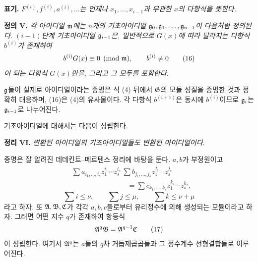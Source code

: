 \medskip
\noindent\textbf{표기.} \emph{\(F^{(i)},f^{(i)},a^{(i)},\ldots\)는 언제나 \(x_1,\ldots,x_{i-1}\)과 무관한 \(x\)의 다항식을 뜻한다.}

\medskip
\noindent\textbf{정의 V.} \emph{각 아이디얼 \(\mathfrak m\)에는 \(n\)개의 기초아이디얼 \(\mathfrak g_0,\mathfrak g_1,\ldots,\mathfrak g_{n-1}\)이 다음처럼 정의된다. \((i-1)\)단계 기초아이디얼 \(\mathfrak g_{i-1}\)은, 일반적으로 \(G(x)\)에 따라 달라지는 다항식 \(b^{(i)}\)가 존재하여
\begin{equation}
b^{(i)}G(x)\equiv0\pmod{\mathfrak m},\qquad b^{(i)}\ne0
\tag{16}
\end{equation}
이 되는 다항식 \(G(x)\)만을, 그리고 그 모두를 포함한다.}

\(\mathfrak g\)들이 실제로 아이디얼이라는 증명은 식 (4) 뒤에서 \(\mathfrak G\)의 모듈 성질을 증명한 것과 정확히 대응하며, (16)은 (4)의 유사물이다. 각 다항식 \(b^{(i+1)}\)은 동시에 \(b^{(i)}\)이므로 \(\mathfrak g_i\)는 \(\mathfrak g_{i-1}\)로 나누어진다.

기초아이디얼에 대해서는 다음이 성립한다.

\medskip
\noindent\textbf{정리 VI.} \emph{변환된 아이디얼의 기초아이디얼들도 변환된 아이디얼이다}.

증명은 잘 알려진 데데킨트--메르텐스 정리에 바탕을 둔다. \(a,b\)가 부정원이고
\[
\begin{aligned}
&\sum a_{i_1,\ldots,i_s}z_1^{i_1}\cdots z_s^{i_s}\,
\sum b_{j_1,\ldots,j_s}z_1^{j_1}\cdots z_s^{j_s}\\
&\hspace{8em}=
\sum c_{k_1,\ldots,k_s}z_1^{k_1}\cdots z_s^{k_s},
\end{aligned}
\]
\[
\sum i\le\nu,\qquad
\sum j\le\mu,\qquad
\sum k\le\nu+\mu
\]
라고 하자. 또 \(\mathfrak A,\mathfrak B,\mathfrak C\)가 각각 \(a,b,c\)들로부터 유리정수에 의해 생성되는 모듈이라고 하자. 그러면 어떤 지수 \(q\)가 존재하여 항등식
\begin{equation}
\mathfrak A^q\mathfrak B=\mathfrak A^{q-1}\mathfrak C
\tag{17}
\end{equation}
이 성립한다. 여기서 \(\mathfrak A^q\)는 \(a\)들의 \(q\)차 거듭제곱곱들과 그 정수계수 선형결합들로 이루어진다.

